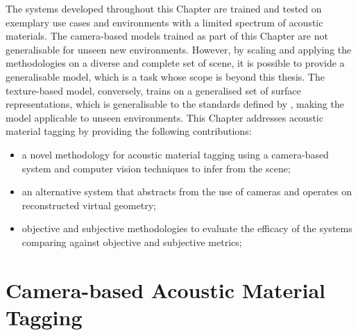 The systems developed throughout this Chapter are trained and tested on exemplary use cases and environments with a limited spectrum of acoustic materials. The camera-based models trained as part of this Chapter are not generalisable for unseen new environments. However, by scaling and applying the methodologies on a diverse and complete set of scene, it is possible to provide a generalisable model, which is a task whose scope is beyond this thesis. The texture-based model, conversely, trains on a generalised set of surface representations, which is generalisable to the standards defined by \cite{bell2013opensurfaces}, making the model applicable to unseen environments.
This Chapter addresses acoustic material tagging by providing the following contributions:
\begin{itemize}
    \item a novel methodology for acoustic material tagging using a camera-based system and computer vision techniques to infer from the scene;
    \item an alternative system that abstracts from the use of cameras and operates on reconstructed virtual geometry;
    \item objective and subjective methodologies to evaluate the efficacy of the systems comparing against objective and subjective metrics;
\end{itemize}

\section{Camera-based Acoustic Material Tagging}\label{sec:camera-tagging}
